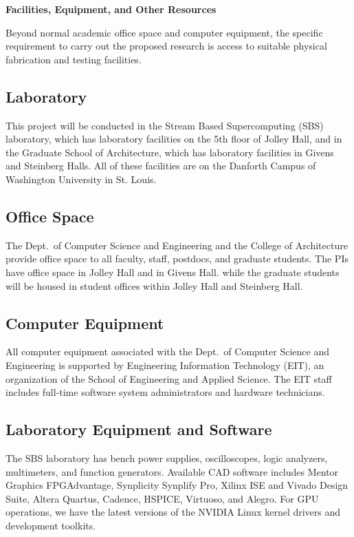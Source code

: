 \documentclass[11pt]{article}
\begin{document}
\pagestyle{empty}
\thispagestyle{empty}

\begin{center}
\textbf{\Large Facilities, Equipment, and Other Resources}
\end{center}

\noindent
Beyond normal academic office space and computer equipment, the 
specific requirement to carry out the proposed research is access to
suitable physical fabrication and testing facilities.

\subsection*{Laboratory}

This project will be conducted in the Stream Based Supercomputing
(SBS) laboratory, which has laboratory
facilities on the 5th floor of Jolley Hall,
and in the Graduate School of Architecture, which has laboratory
facilities in Givens and Steinberg Halls.
All of these facilities are on the Danforth
Campus of Washington University in St. Louis.

\subsection*{Office Space}

The Dept.\ of Computer Science and Engineering and the College of
Architecture provide office space to
all faculty, staff, postdocs, and graduate students.  The PIs have office
space in Jolley Hall and in Givens Hall.
while the graduate students will be housed in student offices
within Jolley Hall and Steinberg Hall.

\subsection*{Computer Equipment}

All computer equipment associated with the Dept.\ of Computer Science
and Engineering is supported by Engineering Information Technology
(EIT), an organization of the School of Engineering and Applied
Science.  The EIT staff includes full-time software system
administrators and hardware technicians.

\subsection*{Laboratory Equipment and Software}

The SBS laboratory has bench power supplies, oscilloscopes, logic
analyzers, multimeters, and function generators.  Available CAD
software includes Mentor Graphics FPGAdvantage, Synplicity Synplify
Pro, Xilinx ISE and Vivado Design Suite, Altera Quartus, Cadence,
HSPICE, Virtuoso, and Alegro.  For GPU operations, we have the latest
versions of the NVIDIA Linux kernel drivers and development toolkits.
\end{document}
